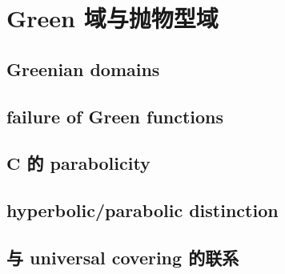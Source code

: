 \section{Green 域与抛物型域}
\label{b3:sec:1702}


\subsection{Greenian domains}
\label{b3:subsec:170201}

\subsection{failure of Green functions}
\label{b3:subsec:170202}

\subsection{\texorpdfstring{\(\mathbf C\)}{m} 的 parabolicity}
\label{b3:subsec:170203}

\subsection{hyperbolic/parabolic distinction}
\label{b3:subsec:170204}

\subsection{与 universal covering 的联系}
\label{b3:subsec:170205}


